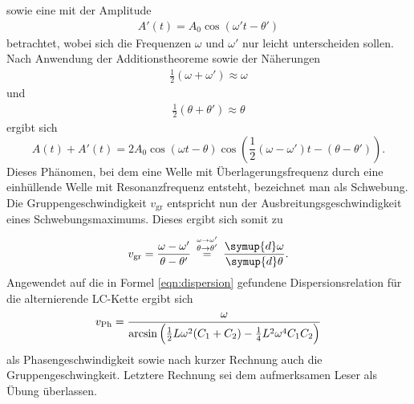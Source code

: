 sowie eine mit der Amplitude
\begin{align*}
A'(t) = A_0 \cos{(\omega' t - \theta')}
\end{align*}
betrachtet, wobei sich die Frequenzen $\omega$ und $\omega'$ nur leicht unterscheiden sollen.
Nach Anwendung der Additionstheoreme sowie der Näherungen
\begin{align*}
  \frac{1}{2}(\omega + \omega') \approx \omega
\end{align*}
und
\begin{align*}
  \frac{1}{2}(\theta + \theta') \approx \theta
\end{align*}
ergibt sich
\begin{equation}
A(t) + A'(t) = 2 A_0 \cos{(\omega t - \theta)} \cos{(\frac{1}{2} (\omega - \omega')t - (\theta - \theta'))}.
\end{equation}
Dieses Phänomen, bei dem eine Welle mit Überlagerungsfrequenz durch eine einhüllende Welle mit Resonanzfrequenz entsteht, bezeichnet man als Schwebung.
Die Gruppengeschwindigkeit $v_{\text{gr}}$ entspricht nun der Ausbreitungsgeschwindigkeit eines Schwebungsmaximums.
Dieses ergibt sich somit zu
\begin{equation}
  \label{eqn:gruppe}
  v_{\text{gr}} = \frac{\omega - \omega'}{\theta - \theta'} \: \stackrel{\stackrel{\omega \to \omega'}{\theta \to \theta'}}{=} \: \frac{\symup{d}\omega}{\symup{d}\theta}.
\end{equation}
Angewendet auf die in Formel \ref{eqn:dispersion} gefundene Dispersionsrelation für die alternierende LC-Kette ergibt sich
\begin{equation}
  v_{\text{Ph}} = \frac{\omega}{\arcsin{\Bigl( \frac{1}{2} L \omega^2 (C_1 + C_2) - \frac{1}{4} L^2 \omega^4 C_1 C_2   \Bigr)}}
\end{equation}
als Phasengeschwindigkeit sowie nach kurzer Rechnung auch die Gruppengeschwingkeit.
Letztere Rechnung sei dem aufmerksamen Leser als Übung überlassen.
